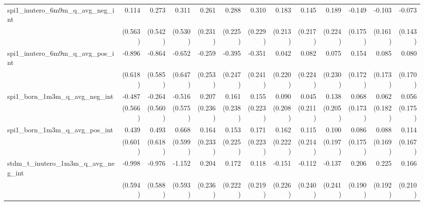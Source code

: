 \begin{tabular}{lrrrrrrrrrrrr}
spi1\_inutero\_6m9m\_q\_avg\_neg\_int       &        0.114 &        0.273 &        0.311 &        0.261 &        0.288 &        0.310 &        0.183 &        0.145 &        0.189 &       -0.149 &       -0.103 &       -0.073 \\ 
                                            &      (0.563) &      (0.542) &      (0.530) &      (0.231) &      (0.225) &      (0.229) &      (0.213) &      (0.217) &      (0.224) &      (0.175) &      (0.161) &      (0.143) \\ 
spi1\_inutero\_6m9m\_q\_avg\_pos\_int       &       -0.896 &       -0.864 &       -0.652 &       -0.259 &       -0.395 &       -0.351 &        0.042 &        0.082 &        0.075 &        0.154 &        0.085 &        0.080 \\ 
                                            &      (0.618) &      (0.585) &      (0.647) &      (0.253) &      (0.247) &      (0.241) &      (0.220) &      (0.224) &      (0.230) &      (0.172) &      (0.173) &      (0.170) \\ 
spi1\_born\_1m3m\_q\_avg\_neg\_int          &       -0.487 &       -0.264 &       -0.516 &        0.207 &        0.161 &        0.155 &        0.090 &        0.045 &        0.138 &        0.068 &        0.062 &        0.056 \\ 
                                            &      (0.566) &      (0.560) &      (0.575) &      (0.236) &      (0.238) &      (0.223) &      (0.208) &      (0.211) &      (0.205) &      (0.173) &      (0.182) &      (0.175) \\ 
spi1\_born\_1m3m\_q\_avg\_pos\_int          &        0.439 &        0.493 &        0.668 &        0.164 &        0.153 &        0.171 &        0.162 &        0.115 &        0.100 &        0.086 &        0.088 &        0.114 \\ 
                                            &      (0.601) &      (0.618) &      (0.599) &      (0.233) &      (0.225) &      (0.223) &      (0.222) &      (0.214) &      (0.197) &      (0.175) &      (0.169) &      (0.167) \\ 
stdm\_t\_inutero\_1m3m\_q\_avg\_neg\_int    &       -0.998 &       -0.976 &       -1.152 &        0.204 &        0.172 &        0.118 &       -0.151 &       -0.112 &       -0.137 &        0.206 &        0.225 &        0.166 \\ 
                                            &      (0.594) &      (0.588) &      (0.593) &      (0.236) &      (0.222) &      (0.219) &      (0.226) &      (0.240) &      (0.241) &      (0.190) &      (0.192) &      (0.210) \\ 

\end{tabular}
